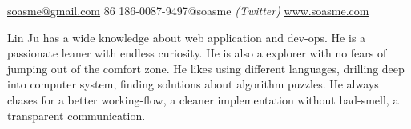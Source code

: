 \documentclass[10pt,a4paper]{article} %
\begin{document}


\noindent\href{mailto:soasme@gmail.com}{soasme@gmail.com}\bull
\textsmaller{+}86 186-0087-9497\bull @soasme \textit{(Twitter)}\bull
\href{http://www.soasme.com}{www.soasme.com}\\ %
\spacedhrule{0.9em}{-0.4em} %



\vspace{-1.3em} %

\begin{multicols}{2}  %
  Lin Ju has a wide knowledge about web application and dev-ops. He is a passionate leaner with endless curiosity. He is also a explorer with no fears of jumping out of the comfort zone. He likes using different languages, drilling deep into computer system, finding solutions about algorithm puzzles. He always chases for a better working-flow, a cleaner implementation without bad-smell, a transparent communication.
\end{multicols}

\spacedhrule{0.5em}{-0.4em} %


\end{document}
